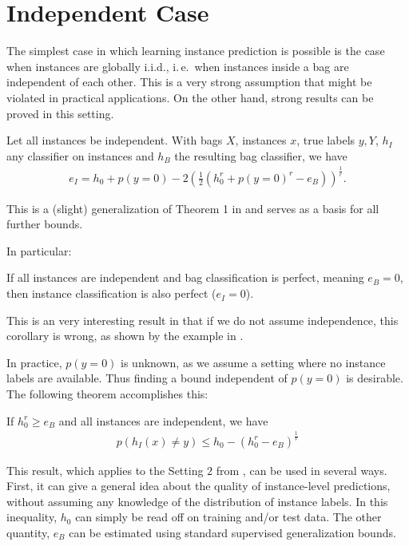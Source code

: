 \section{Independent Case}
The simplest case in which learning instance prediction is possible is the case when instances are globally i.i.d.,
i.\,e.\ when instances inside a bag are independent of each other. This is a very strong assumption that might be
violated in practical applications. On the other hand, strong results can be proved in this setting.

\begin{theorem}\label{basicthm}
Let all instances be independent. With bags $X$, instances $x$, true labels $y,Y$, $h_I$ any classifier
on instances and $h_B$ the resulting bag classifier, we have
\begin{align*}
   e_I = h_0 + p(y=0) - 2 \left (\frac{1}{2} ( h_0^r + p(y=0)^r - e_B) \right)^\frac{1}{r}.
\end{align*}
\end{theorem}
This is a (slight) generalization of Theorem 1 in \citet{sabato2010reducing} and serves as a basis for all further bounds. 

In particular:
\begin{corollary}\label{perfect}
If all instances are independent and bag classification is perfect, meaning $e_B=0$, then instance classification is also perfect ($e_I =0$).
\end{corollary}
This is an very interesting result in that if we do not assume independence, this corollary is wrong,
as shown by the example in .

In practice, $p(y=0)$ is unknown, as we assume a setting where no instance labels are available.
Thus finding a bound independent of $p(y=0)$ is desirable. The following theorem accomplishes this:

\begin{theorem}\label{iidbound}
If $h_0^r  \geq e_B$ and all instances are independent, we have
\begin{align}
    p(h_I(x)\neq y) \leq h_0 - \left ( h_0^r - e_B \right ) ^ \frac{1}{r}
\end{align}
\end{theorem}

This result, which applies to the Setting $2$ from ,
can be used in several ways. First, it can give a general idea about the quality of instance-level
predictions, without assuming any knowledge of the distribution of instance labels. In this inequality,
$h_0$ can simply be read off on training and/or test data. The other quantity, $e_B$ can be
estimated using standard supervised generalization bounds.

